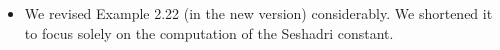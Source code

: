 \documentclass[12pt,twoside,reqno]{amsart}
\numberwithin{equation}{section}
\theoremstyle{definition}
\begin{document}
\begin{itemize}

\item We  revised Example 2.22 (in the new version) considerably. We shortened it to focus solely on the computation of the Seshadri constant.
\end{itemize}


\end{document}
